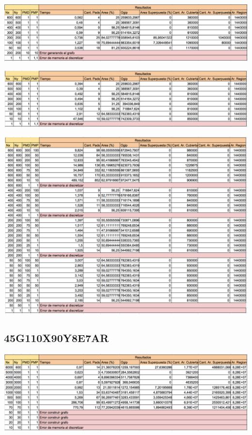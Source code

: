\begin{center}
\includegraphics[width=1\textwidth]{imagenes/S_45G1200x1200_muchos}
\end{center}

\begin{center}
\includegraphics[width=1\textwidth]{imagenes/G_45G1200x1200_muchos}
\end{center}

\begin{center}
\includegraphics[width=1\textwidth]{imagenes/GML_45G1200x1200_muchos}
\end{center}


\subsection{45G110X90Y8E7AR}

\begin{center}
\includegraphics[width=1\textwidth]{imagenes/S_45G110X90Y8E7AR}
\end{center}

